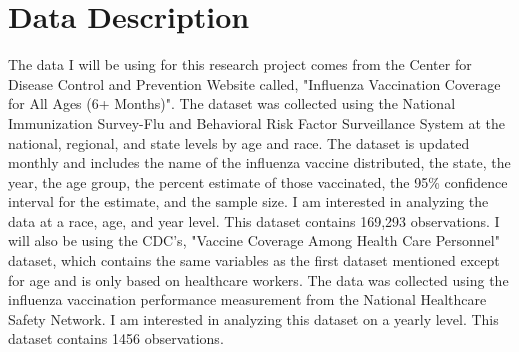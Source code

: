 \documentclass[12pt]{article}
\begin{document}
\section{Data Description}
\label{sec:data}
The data I will be using for this research project comes from the Center for Disease Control and Prevention Website called, 
"Influenza Vaccination Coverage for All Ages (6+ Months)". The dataset was collected using the National Immunization Survey-Flu and 
Behavioral Risk Factor Surveillance System at the national, regional, and state levels by age and race. The dataset is updated monthly and 
includes the name of the influenza vaccine distributed, the state, the year, the age group, the percent estimate of those vaccinated, 
the 95\% confidence interval for the estimate, and the sample size. I am interested in analyzing the data at a race, age, and year 
level. This dataset contains 169,293 observations. I will also be using the CDC's, "Vaccine Coverage Among Health Care Personnel" dataset, 
which contains the same variables as the first dataset mentioned except for age and is only based on healthcare workers. The data was collected 
using the influenza vaccination performance measurement from the National Healthcare Safety Network. I am interested in analyzing this dataset 
on a yearly level. This dataset contains 1456 observations. 
\end{document}
